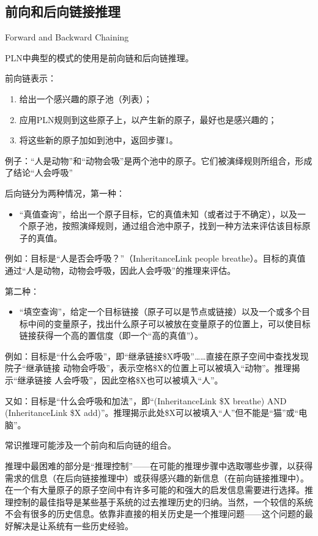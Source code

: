 \subsection{前向和后向链接推理}{Forward and Backward Chaining}

PLN中典型的模式的使用是前向链和后向链推理。

前向链表示：

\begin{enumerate}
\item 给出一个感兴趣的原子池（列表）；
\item 应用PLN规则到这些原子上，以产生新的原子，最好也是感兴趣的；
\item 将这些新的原子加如到池中，返回步骤1。
\end{enumerate}

例子：“人是动物”和“动物会吸”是两个池中的原子。它们被演绎规则所组合，形成了结论“人会呼吸”

后向链分为两种情况，第一种：

\begin{itemize}
\item “真值查询”，给出一个原子目标，它的真值未知（或者过于不确定），以及一个原子池，按照演绎规则，通过组合池中原子，找到一种方法来评估该目标原子的真值。
\end{itemize}

例如：目标是“人是否会呼吸？”（InheritanceLink people breathe）。目标的真值通过“人是动物，动物会呼吸，因此人会呼吸”的推理来评估。

第二种：

\begin{itemize}
\item “填空查询”，给定一个目标链接（原子可以是节点或链接）以及一个或多个目标中间的变量原子，找出什么原子可以被放在变量原子的位置上，可以使目标链接获得一个高的置信度（即一个“高的真值”）。
\end{itemize}

例如：目标是“什么会呼吸”，即“继承链接\$X呼吸”……直接在原子空间中查找发现院子“继承链接 动物会呼吸”，表示空格\$X的位置上可以被填入“动物”。推理揭示“继承链接 人会呼吸”，因此空格\$X也可以被填入“人”。

又如：目标是“什么会呼吸和加法”，即“(InheritanceLink \$X breathe) AND (InheritanceLink \$X add)”。推理揭示此处\$X可以被填入“人”但不能是“猫”或“电脑”。

常识推理可能涉及一个前向和后向链的组合。

推理中最困难的部分是“推理控制”——在可能的推理步骤中选取哪些步骤，以获得需求的信息（在后向链接推理中）或获得感兴趣的新信息（在前向链接推理中）。在一个有大量原子的原子空间中有许多可能的和强大的启发信息需要进行选择。推理控制的最佳指导是某些基于系统的过去推理历史的归纳。当然，一个较信的系统不会有很多的历史信息。依靠非直接的相关历史是一个推理问题——这个问题的最好解决是让系统有一些历史经验。

